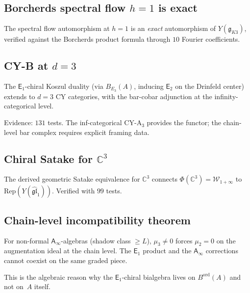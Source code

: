 \documentclass[11pt]{article}
\newcommand{\cW}{\mathcal{W}}
\newcommand{\fg}{\mathfrak{g}}
\newcommand{\fgl}{\mathfrak{gl}}
\newcommand{\C}{\mathbb{C}}
\newcommand{\Eone}{\mathsf{E}_1}
\newcommand{\Etwo}{\mathsf{E}_2}
\newcommand{\Ainf}{\mathsf{A}_{\infty}}
\newcommand{\Rep}{\mathrm{Rep}}
\begin{document}
\subsection{Borcherds spectral flow $h=1$ is exact}

The spectral flow automorphism at $h = 1$ is an \emph{exact}
automorphism of $Y(\fg_{K3})$, verified against the Borcherds product
formula through $10$ Fourier coefficients.

\subsection{CY-B at $d = 3$}

\begin{conjecture}[CY-B at $d = 3$, conditional]
\label{conj:cy-b-d3}
The $\Eone$-chiral Koszul duality (via $B_{E_3}(A)$, inducing $\Etwo$
on the Drinfeld center) extends to $d = 3$ CY categories,
with the bar-cobar adjunction at the infinity-categorical level.
\end{conjecture}

Evidence: $131$ tests. The inf-categorical CY-A$_3$ provides the
functor; the chain-level bar complex requires explicit framing data.

\subsection{Chiral Satake for $\C^3$}

\begin{proposition}[Chiral Satake for $\C^3$]
The derived geometric Satake equivalence for $\C^3$ connects
$\Phi(\C^3) = \cW_{1+\infty}$ to $\Rep(Y(\widehat{\fgl}_1))$.
Verified with $99$ tests.
\end{proposition}

\subsection{Chain-level incompatibility theorem}

\begin{theorem}
\label{thm:chain-incompatibility}
For non-formal $\Ainf$-algebras (shadow class $\geq L$),
$\mu_3 \neq 0$ forces $\mu_2 = 0$ on the augmentation ideal
at the chain level. The $\Eone$ product and the $\Ainf$ corrections
cannot coexist on the same graded piece.
\end{theorem}

This is the algebraic reason why the $\Eone$-chiral bialgebra
lives on $B^{\mathrm{ord}}(A)$ and not on~$A$ itself.
\end{document}
